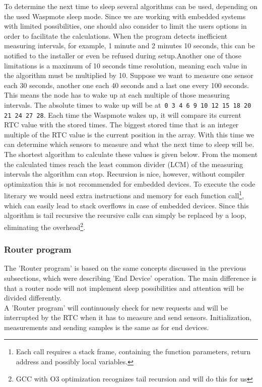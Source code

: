 To determine the next time to sleep several algorithms can be used, depending on the used Waspmote sleep mode. Since we are working with embedded systems with limited possibilities, one should also consider to limit the users options in order to facilitate the calculations. When the program detects inefficient measuring intervals, for example, 1 minute and 2 minutes 10 seconds, this can be notified to the installer or even be refused during setup.Another one of those limitations is a maximum of 10 seconds time resolution, meaning each value in the algorithm must be multiplied by 10. Suppose we want to measure one sensor each 30 seconds, another one each 40 seconds and a last one every 100 seconds. This means the node has to wake up at each multiple of those measuring intervals. The absolute times to wake up will be at\verb+ 0 3 4 6 9 10 12 15 18 20 21 24 27 28+. Each time the Waspmote wakes up, it will compare its current RTC value with the stored times. The biggest stored time that is an integer multiple of the RTC value is the current position in the array. With this time we can determine which sensors to measure and what the next time to sleep will be. The shortest algorithm to calculate these values is given below. From the moment the calculated times reach the least common divider (LCM) of the measuring intervals the algorithm can stop. Recursion is nice, however, without compiler optimization this is not recommended for embedded devices. To execute the code literary we would need extra instructions and memory for each function call\footnote{Each call requires a stack frame, containing the function parameters, return address and possibly local variables.}, which can easily lead to stack overflows in case of embedded devices. Since this algorithm is tail recursive the recursive calls can simply be replaced by a loop, eliminating the overhead\footnote{GCC with O3 optimization recognizes tail recursion and will do this for us}.
\subsubsection{Router program}
The 'Router program' is based on the same concepts discussed in the previous subsections, which were describing 'End Device' operation. The main difference is that a router node will not implement sleep possibilities and attention will be divided differently.\\
A 'Router program' will continuously check for new requests and will be interrupted by the RTC when it has to measure and send sensors. Initialization, measurements and sending samples is the same as for end devices.

